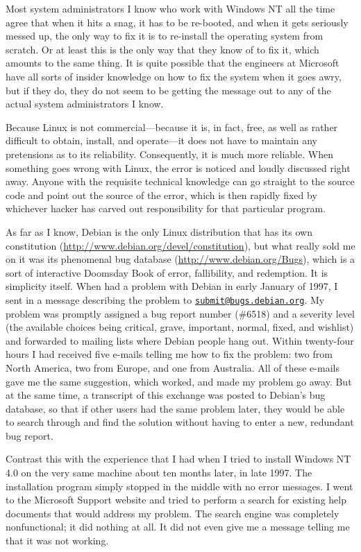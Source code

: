 \documentclass[
  fontsize=11pt,
  paper=landscape,
  twocolumn=true,
  pagesize=pdftex,
  headings=small,
  DIV=15,
  ]{scrartcl}
\begin{document}
Most system administrators I know who work with Windows NT all the time
agree that when it hits a snag, it has to be re-booted, and when it gets
seriously messed up, the only way to fix it is to re-install the
operating system from scratch. Or at least this is the only way that
they know of to fix it, which amounts to the same thing. It is quite
possible that the engineers at Microsoft have all sorts of insider
knowledge on how to fix the system when it goes awry, but if they do,
they do not seem to be getting the message out to any of the actual
system administrators I know.

Because Linux is not commercial---because it is, in fact, free, as well
as rather difficult to obtain, install, and operate---it does not have
to maintain any pretensions as to its reliability. Consequently, it is
much more reliable. When something goes wrong with Linux, the error is
noticed and loudly discussed right away. Anyone with the requisite
technical knowledge can go straight to the source code and point out the
source of the error, which is then rapidly fixed by whichever hacker has
carved out responsibility for that particular program.

As far as I know, Debian is the only Linux distribution that has its own
constitution (\url{http://www.debian.org/devel/constitution}), but what
really sold me on it was its phenomenal bug database
(\url{http://www.debian.org/Bugs}), which is a sort of interactive
Doomsday Book of error, fallibility, and redemption. It is simplicity
itself. When had a problem with Debian in early January of 1997, I sent
in a message describing the problem to
\href{mailto:submit@bugs.debian.org}{\lstinline!submit@bugs.debian.org!}.
My problem was promptly assigned a bug report number (\#6518) and a
severity level (the available choices being critical, grave, important,
normal, fixed, and wishlist) and forwarded to mailing lists where Debian
people hang out. Within twenty-four hours I had received five e-mails
telling me how to fix the problem: two from North America, two from
Europe, and one from Australia. All of these e-mails gave me the same
suggestion, which worked, and made my problem go away. But at the same
time, a transcript of this exchange was posted to Debian's bug database,
so that if other users had the same problem later, they would be able to
search through and find the solution without having to enter a new,
redundant bug report.

Contrast this with the experience that I had when I tried to install
Windows NT 4.0 on the very same machine about ten months later, in late
1997. The installation program simply stopped in the middle with no
error messages. I went to the Microsoft Support website and tried to
perform a search for existing help documents that would address my
problem. The search engine was completely nonfunctional; it did nothing
at all. It did not even give me a message telling me that it was not
working.
\end{document}
